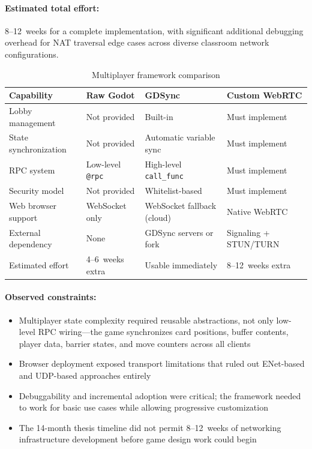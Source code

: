 \paragraph*{Estimated total effort:} 8--12~weeks for a complete implementation, with significant additional debugging overhead for NAT traversal edge cases across diverse classroom network configurations.

\begin{table}[htbp]
    \centering
    \caption{Multiplayer framework comparison}
    \label{tab:multiplayer-comparison}
    \begin{tabular}{@{}p{3.5cm}p{3.5cm}p{3.5cm}p{3.5cm}@{}}
        \toprule
        \textbf{Capability}   & \textbf{Raw Godot}      & \textbf{GDSync}                & \textbf{Custom WebRTC} \\
        \midrule
        Lobby management      & Not provided            & Built-in                       & Must implement         \\
        \midrule
        State synchronization & Not provided            & Automatic variable sync        & Must implement         \\
        \midrule
        RPC system            & Low-level \texttt{@rpc} & High-level \texttt{call\_func} & Must implement         \\
        \midrule
        Security model        & Not provided            & Whitelist-based                & Must implement         \\
        \midrule
        Web browser support   & WebSocket only          & WebSocket fallback (cloud)     & Native WebRTC          \\
        \midrule
        External dependency   & None                    & GDSync servers or fork         & Signaling + STUN/TURN  \\
        \midrule
        Estimated effort      & 4--6~weeks extra        & Usable immediately             & 8--12~weeks extra      \\
        \bottomrule
    \end{tabular}
\end{table}

\paragraph*{Observed constraints:}
\begin{itemize}
    \item Multiplayer state complexity required reusable abstractions, not only low-level RPC wiring---the game synchronizes card positions, buffer contents, player data, barrier states, and move counters across all clients
    \item Browser deployment exposed transport limitations that ruled out ENet-based and UDP-based approaches entirely
    \item Debuggability and incremental adoption were critical; the framework needed to work for basic use cases while allowing progressive customization
    \item The 14-month thesis timeline did not permit 8--12~weeks of networking infrastructure development before game design work could begin
\end{itemize}

